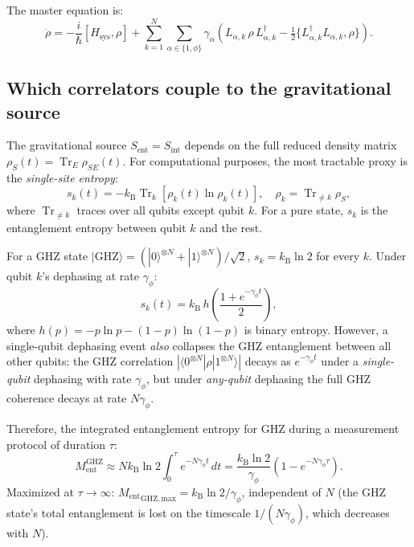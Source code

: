 \documentclass[12pt,letterpaper]{article}
\theoremstyle{plain}
\theoremstyle{definition}
\theoremstyle{remark}
\newcommand{\kB}{k_{\mathrm{B}}}
\newcommand{\Sent}{S_{\mathrm{ent}}}
\newcommand{\Ment}{M_{\mathrm{ent}}}
\newcommand{\tr}{\operatorname{Tr}}
\begin{document}
The master equation is:
\begin{equation}
  \dot{\rho}
  = -\frac{i}{\hbar}[H_{\mathrm{sys}},\rho]
  + \sum_{k=1}^{N}\sum_{\alpha\in\{1,\phi\}}\gamma_\alpha\!
    \left(L_{\alpha,k}\,\rho\,L_{\alpha,k}^\dagger
    - \tfrac{1}{2}\{L_{\alpha,k}^\dagger L_{\alpha,k},\rho\}\right).
  \label{eq:lindblad}
\end{equation}

\subsection{Which correlators couple to the gravitational source}

The gravitational source $\Sent = S_{\mathrm{int}}$ depends on the full reduced density
matrix $\rho_S(t) = \tr_E\rho_{SE}(t)$.  For computational purposes, the most tractable
proxy is the \emph{single-site entropy}:
\begin{equation}
  s_k(t) = -\kB\tr_k\!\left[\rho_k(t)\ln\rho_k(t)\right],
  \quad
  \rho_k = \tr_{\neq k}\rho_S,
  \label{eq:single-site}
\end{equation}
where $\tr_{\neq k}$ traces over all qubits except qubit $k$.  For a pure state,
$s_k$ is the entanglement entropy between qubit $k$ and the rest.

For a GHZ state $|\text{GHZ}\rangle = (|0\rangle^{\otimes N}+|1\rangle^{\otimes N})/\sqrt{2}$,
$s_k = \kB\ln 2$ for every $k$.  Under qubit $k$'s dephasing at rate $\gamma_\phi$:
\begin{equation}
  s_k(t) = \kB\,h\!\left(\frac{1 + e^{-\gamma_\phi t}}{2}\right),
  \label{eq:sk-decay}
\end{equation}
where $h(p) = -p\ln p - (1-p)\ln(1-p)$ is binary entropy.  However, a single-qubit
dephasing event \emph{also} collapses the GHZ entanglement between all other qubits:
the GHZ correlation $|\langle 0^{\otimes N}|\rho|1^{\otimes N}\rangle|$ decays as
$e^{-\gamma_\phi t}$ under a \emph{single-qubit} dephasing with rate $\gamma_\phi$,
but under \emph{any-qubit} dephasing the full GHZ coherence decays at rate $N\gamma_\phi$.

Therefore, the integrated entanglement entropy for GHZ during a measurement protocol of
duration $\tau$:
\begin{equation}
  \Ment^{\mathrm{GHZ}}
  \approx N\kB\ln 2 \int_0^\tau e^{-N\gamma_\phi t}\,dt
  = \frac{\kB\ln 2}{\gamma_\phi}\left(1 - e^{-N\gamma_\phi\tau}\right).
  \label{eq:Ment-GHZ}
\end{equation}
Maximized at $\tau \to \infty$: ${\Ment}_{\mathrm{GHZ,max}} = \kB\ln 2/\gamma_\phi$,
independent of $N$ (the GHZ state's total entanglement is lost on the timescale
$1/(N\gamma_\phi)$, which decreases with $N$).
\end{document}
